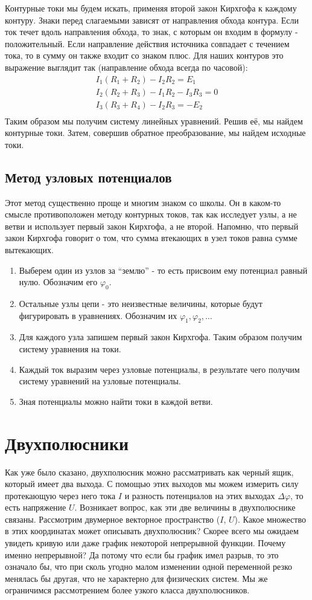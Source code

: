 \documentclass[11pt,a4paper]{article}
\begin{document}
Контурные токи мы будем искать, применяя второй закон Кирхгофа к каждому контуру.
Знаки перед слагаемыми зависят от направления обхода контура. Если ток течет вдоль направления 
обхода, то знак, с которым он входим в формулу - положительный. Если направление действия источника 
совпадает с течением тока, то в сумму он также входит со знаком плюс.
Для наших контуров это выражение выглядит так (направление обхода всегда по часовой):
$$\begin{array}{l}
I_1 (R_1 + R_2) - I_2 R_2 = E_1 \\
I_2 (R_2 + R_3) - I_1 R_2 - I_3R_3 = 0 \\
I_3 (R_3 + R_4) - I_2 R_3 = - E_2 \\
\end{array}$$
Таким образом мы получим систему линейных уравнений. Решив её, мы найдем контурные токи. Затем, 
совершив обратное преобразование, мы найдем исходные токи. 
\subsection*{Метод узловых потенциалов}
Этот метод существенно проще и многим знаком со школы. Он в каком-то смысле противоположен методу 
контурных токов, так как исследует узлы, а не ветви и использует первый закон Кирхгофа, а не второй. 
Напомню, что первый закон Кирхгофа говорит о том, что сумма втекающих в узел токов равна сумме вытекающих.
\begin{enumerate}
    \item Выберем один из узлов за ``землю'' - то есть присвоим ему потенциал равный нулю. Обозначим его $\varphi_0$.
    \item Остальные узлы цепи - это неизвестные величины, которые будут фигурировать в уравнениях. Обозначим их $\varphi_1, \varphi_2, \dots$
    \item Для каждого узла запишем первый закон Кирхгофа. Таким образом получим систему уравнения на токи.
    \item Каждый ток выразим через узловые потенциалы, в результате чего получим систему уравнений на узловые потенциалы.
    \item Зная потенциалы можно найти токи в каждой ветви.
\end{enumerate}

\section*{Двухполюсники}
Как уже было сказано, двухполюсник можно рассматривать как черный ящик, который имеет два выхода. 
С помощью этих выходов мы можем измерить силу протекающую через него тока $I$ и разность потенциалов 
на этих выходах $\Delta\varphi$, то есть напряжение $U$. Возникает вопрос, как эти две величины в двухполюснике связаны.
Рассмотрим двумерное векторное пространство ($I$, $U$). Какое множество в этих координатах может описывать 
двухполюсник? Скорее всего мы ожидаем увидеть кривую или даже график некоторой непрерывной функции. Почему 
именно непрерывной? Да потому что если бы график имел разрыв, то это означало бы, что при сколь угодно 
малом изменении одной переменной резко менялась бы другая, что не характерно для физических систем. 
Мы же ограничимся рассмотрением более узкого класса двухполюсников.
\end{document}
